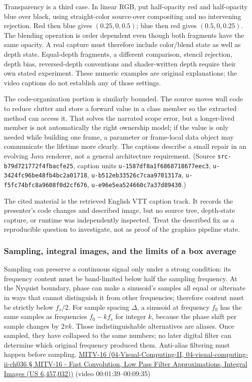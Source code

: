 Transparency is a third case. In linear RGB, put half-opacity red and half-opacity blue over black, using straight-color source-over compositing and no intervening rejection. Red then blue gives \((0.25,0,0.5)\); blue then red gives \((0.5,0,0.25)\). The blending operation is order dependent even though both fragments have the same opacity. A real capture must therefore include color/blend state as well as depth state. Equal-depth fragments, a different comparison, stencil rejection, depth bias, reversed-depth conventions and shader-written depth require their own stated experiment. These numeric examples are original explanations; the video captions do not establish any of those settings.

The code-organization portion is similarly bounded. The source moves wall code to reduce clutter and store a forward value in a class member so the extracted method can access it. That solves the narrated scope error, but a longer-lived member is not automatically the right ownership model; if the value is only needed while building one frame, a parameter or frame-local data object may communicate the lifetime more clearly. The captions describe a small repair in an evolving Java renderer, not a general architecture requirement. (Source \texttt{src-b79d721772f4fbacfe25}, caption units \texttt{u-1587df8a1f6868718677eec3}, \texttt{u-3424fc96be48fb4bc2a01718}, \texttt{u-b512eb33526c7caa9701317a}, \texttt{u-f5fc74bfc8a9608f0d2cf676}, \texttt{u-e96e5ea524660c7a37d89430}.)

The cited material is the retrieved English VTT caption track. It records the presenter's code changes and described image, but no source tree, depth-state capture, or runtime was independently inspected. Treat the described fix as a reproducible question to investigate, not as proof of the graphics pipeline state.

\subsubsection{Sampling, integral images, and the limits of a box average}\label{sampling-integral-images-and-the-limits-of-a-box-average}

Sampling can preserve a continuous signal only under a strong condition: its frequency content must be band-limited below half the sampling frequency. At the Nyquist boundary, phase can make a sinusoid's samples all equal or alternate in ways that cannot distinguish it from other frequencies; therefore content must be strictly below \(f_s/2\). For sample spacing \(\Delta\), a sinusoid at frequency \(f_0\) has the same samples as frequencies \(f_0-kf_s\) for integer \(k\), because the phase shift per sample changes by \(2\pi k\). Those indistinguishable alternatives are aliases. Once sampled, they have collapsed to the same numbers; no later digital filter can determine which original frequency produced them. Anti-alias filtering must happen before sampling. \href{}{MITV-16 (04-Visual-Computing-II, 04-visual-computing-ii-ch036 § MITV-16 - Fast Convolution, Low Pass Filter Approximations, Integral Images (US 6,457,032))} (video 00:01:39--00:09:35)

